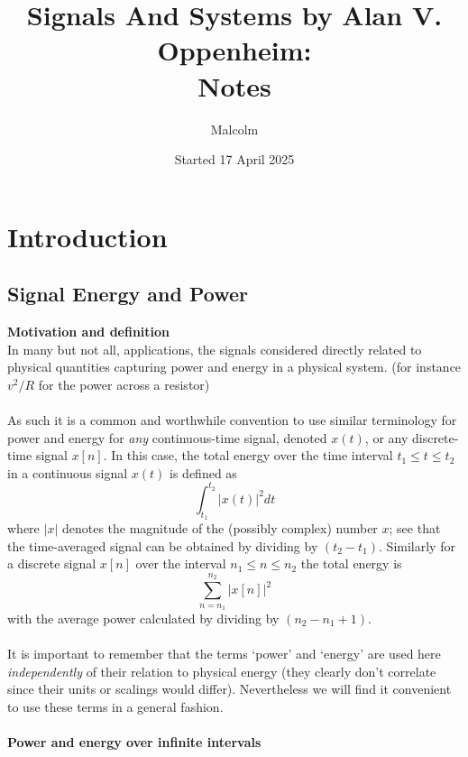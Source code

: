 \documentclass{report}
\title{Signals And Systems by Alan V. Oppenheim:\\Notes}
\date{Started 17 April 2025}
\author{Malcolm}
\begin{document}
\maketitle

\tableofcontents

\newpage
\chapter{Introduction}
\section{Signal Energy and Power}
\textbf{Motivation and definition}\\
In many but not all, applications, the signals considered directly related to physical quantities capturing
power and energy in a physical system. (for instance $v^2/R$ for the power across a resistor)\\
\vspace{1mm}\\
As such it is a common and worthwhile convention to use similar terminology for power and energy for \textit{any} 
continuous-time signal, denoted $x(t)$, or any discrete-time signal $x[n]$. 
In this case, the total energy over the time interval $t_1\leq t\leq t_2$ in a continuous signal $x(t)$ is defined
as
\begin{equation*}
\int^{t_2}_{t_1}|x(t)|^2dt
\end{equation*}
where $|x|$ denotes the magnitude of the (possibly complex) number $x$; see that the time-averaged signal 
can be obtained by dividing by $(t_2-t_1)$. Similarly for a discrete signal $x[n]$ over the interval $n_1\leq n\leq n_2$ the total energy is
\begin{equation*}
\sum^{n_2}_{n=n_1}|x[n]|^2
\end{equation*}
with the average power calculated by dividing by $(n_2-n_1+1)$.\\
\vspace{1mm}\\
It is important to remember that the terms `power' and `energy' are used here \textit{independently} of their 
relation to physical energy (they clearly don't correlate since their units or scalings would differ). Nevertheless
we will find it convenient to use these terms in a general fashion.\\
\vspace{1mm}\\
\textbf{Power and energy over infinite intervals}\\
\end{document}
